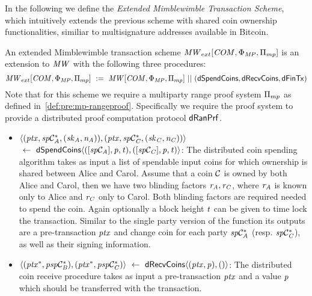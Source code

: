 In the following we define the \emph{Extended Mimblewimble Transaction Scheme}, which intuitively extends the previous scheme with shared coin ownership functionalities, similiar to multisignature addresses available in Bitcoin.

\begin{definition}
    \label{def:atom:ext-mw-tx-scheme}
    An extended Mimblewimble transaction scheme $\mathit{MW}_{ext}[\mathit{COM},\Phi_{\mathit{MP}},\Pi_{mp}]$ is an extension to $\mathit{MW}$ with the following three procedures:
    \[ \mathit{MW}_{ext}[\mathit{COM},\Phi_{\mathit{MP}},\Pi_{mp}] ~:=~ \mathit{MW}[\mathit{COM},\Phi_{\mathit{MP}},\Pi_{mp}] ~||~ (\mathsf{dSpendCoins}, \mathsf{dRecvCoins}, \mathsf{dFinTx}) \]
    Note that for this scheme we require a multiparty range proof system $\Pi_{mp}$ as defined in~\cref{def:pre:mp-rangeproof}.
    Specifically we require the proof system to provide a distributed proof computation protocol $\mathsf{dRanPrf}$.
    \begin{itemize}
        \item $\langle (\mathit{ptx}, \mathit{sp}\mathcal{C}_{\mathit{A}}^*, (\mathit{sk}_{\mathit{A}},\mathit{\mathit{n}_{\mathit{A}}})), (\mathit{ptx}, \mathit{sp}\mathcal{C}_{\mathit{C}}^*, (\mathit{sk}_{\mathit{C}},\mathit{\mathit{n}_{\mathit{C}}})) \rangle$ \\
        $~\leftarrow~ \mathsf{dSpendCoins} \langle ([\mathit{sp}\mathcal{C}_{\mathit{A}}],\mathit{p},\mathit{t}), ([\mathit{sp}\mathcal{C}_{\mathit{C}}],\mathit{p},\mathit{t}) \rangle$:
        The distributed coin spending algorithm takes as input a list of spendable input coins for which ownership is shared between Alice and Carol.
        Assume that a coin $\mathcal{C}$ is owned by both Alice and Carol, then we have two blinding factors $\mathit{r}_{\mathit{A}}, \mathit{r}_{\mathit{C}}$, where $\mathit{r}_{\mathit{A}}$ is known only to Alice and $\mathit{r}_{\mathit{C}}$ only to Carol.
        Both blinding factors are required needed to spend the coin.
        Again optionally a block height $\mathit{t}$ can be given to time lock the transaction.
        Similar to the single party version of the function its outputs are a pre-transaction $\mathit{ptx}$ and change coin for each party $\mathit{sp}\mathcal{C}_{\mathit{A}}^*$ (resp. $\mathit{sp}\mathcal{C}_{\mathit{C}}^*$), as well as their signing information.
        \item $\langle (\mathit{ptx}^*, \mathit{psp}\mathcal{C}_{\mathit{B}}^*), (\mathit{ptx}^*, \mathit{psp}\mathcal{C}_{\mathit{C}}^*) \rangle ~\leftarrow~ \mathsf{dRecvCoins} \langle(\mathit{ptx},\mathit{p}), () \rangle$: The distributed coin receive procedure takes as input a pre-transaction $\mathit{ptx}$ and a value $\mathit{p}$ which should be transferred with the transaction.

\end{itemize}
\end{definition}
